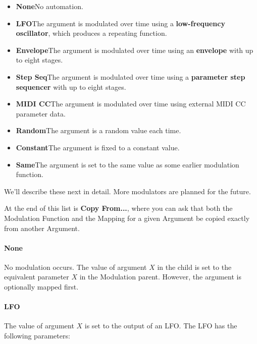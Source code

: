 \documentclass[twoside,10pt]{article}
\begin{document}
\begin{itemize}
\item {\bf None}\qquad No automation.
\item {\bf LFO}\qquad The argument is modulated over time using a {\bf low-frequency oscillator}, which produces a repeating function.
\item {\bf Envelope}\qquad The argument is modulated over time using an {\bf envelope} with up to eight stages.
\item {\bf Step Seq}\qquad The argument is modulated over time using a {\bf parameter step sequencer} with up to eight stages.
\item {\bf MIDI CC}\qquad The argument is modulated over time using external MIDI CC parameter data.
\item {\bf Random}\qquad The argument is a random value each time.
\item {\bf Constant}\qquad The argument is fixed to a constant value.
\item {\bf Same}\qquad The argument is set to the same value as some earlier modulation function.
\end{itemize}

We'll describe these next in detail.  More modulators are planned for the future.  

At the end of this list is {\bf Copy From...}, where you can ask that both the Modulation Function and the Mapping for a given Argument be copied exactly from another Argument.


\paragraph{None}

No modulation occurs.  The value of argument \(X\) in the child is set to the equivalent parameter \(X\) in the Modulation parent.  However, the argument is optionally mapped first.

\paragraph{LFO}

The value of argument \(X\) is set to the output of an LFO.  The LFO has the following parameters:
\end{document}
